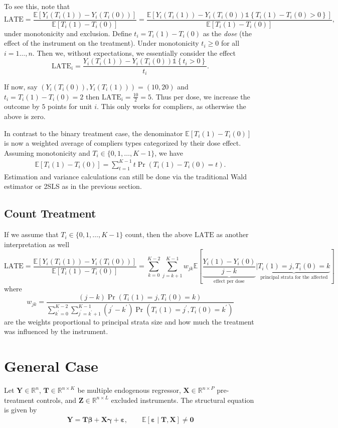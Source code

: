 \documentclass[11pt]{exam}
\theoremstyle{plain}
\newcommand{\E}{\mathbb{E}}
\newcommand{\R}{\mathbb{R}}
\newcommand{\bX}{\bm{X}}
\newcommand{\bY}{\bm{Y}}
\newcommand{\bT}{\bm{T}}
\newcommand{\bZ}{\bm{Z}}
\newcommand{\LATE}{\mathrm{LATE}}
\newcommand{\indicator}[1]{\mathds{1}{\left\{ #1 \right\}}}
\begin{document}
To see this, note that
\[
\LATE = \frac{\E[Y_i(T_i(1)) - Y_i(T_i(0))]}{\E[T_i(1) - T_i(0)]} = \frac{\E[Y_i(T_i(1)) - Y_i(T_i(0)) \indicator{T_i(1) - T_i(0) > 0}]}{\E[T_i(1) - T_i(0)]},
\]
under monotonicity and exclusion. Define $t_i = T_i(1) - T_i(0)$ as the \emph{dose} (the effect of the instrument on the treatment). Under monotonicity $t_i \geq 0$ for all $i = 1\ldots,n$. Then we, without expectations, we essentially consider the effect
\[
    \LATE_i = \frac{Y_i(T_i(1)) - Y_i(T_i(0))\indicator{t_i > 0}}{t_i}.
\]

If now, say $(Y_i(T_i(0)), Y_i(T_i(1))) = (10, 20)$ and $t_i = T_i(1) - T_i(0) = 2$ then $\LATE_i = \frac{10}{2} = 5$. Thus per dose, we increase the outcome by $5$ points for unit $i$. This only works for compliers, as otherwise the above is zero.

In contrast to the binary treatment case, the denominator $\E[T_i(1) - T_i(0)]$ is now a weighted average  of compliers types categorized by their dose effect. Assuming monotonicity and $T_i \in \{0, 1, \ldots, K - 1\}$, we have
\begin{align*}
    \E[T_i(1) - T_i(0)] = \sum_{t = 1}^{K-1} t \Pr(T_i(1) - T_i(0) = t).
\end{align*}
Estimation and variance calculations can still be done via the traditional Wald estimator or 2SLS as in the previous section.

\subsection{Count Treatment}
If we assume that $T_i \in \{0, 1, \ldots, K-1\}$ count, then the above $\LATE$ as another interpretation as well
\[
\LATE = \frac{\E[Y_i(T_i(1)) - Y_i(T_i(0))]}{\E[T_i(1) - T_i(0)]} = \sum_{k=0}^{K-2} \sum_{j=k+1}^{K-1} w_{jk} \E \left[ \underbrace{\frac{Y_i(1) - Y_i(0)}{j - k}}_{\text{effect per dose}} \Bigg | \underbrace{T_i(1) = j, T_i(0) = k}_{\text{principal strata for the affected}}\right]
\]
where 
\[
w_{jk} = \frac{(j-k) \Pr(T_i(1) = j, T_i(0) = k)}{\sum_{k^\prime=0}^{K-2} \sum_{j^\prime=k^\prime+1}^{K-1} (j^\prime - k^\prime) \Pr(T_i(1) = j^\prime, T_i(0) = k^\prime)}
\]
are the weights proportional to principal strata size and how much the treatment was influenced by the instrument.

\section{General Case}
Let $\bY\in\R^n$, $\bT\in\R^{n\times K}$ be multiple endogenous regressor, $\bX\in\R^{n\times P}$ pre-treatment controls, and $\bZ\in\R^{n\times L}$ excluded instruments. The structural equation is given by
\begin{align*}
    \bY = \bT \bm{\beta} + \bX \bm{\gamma} + \bm{\varepsilon}, \qquad \E[\bm{\varepsilon} \mid \bT, \bX] \neq \bm{0}
\end{align*}
\end{document}
